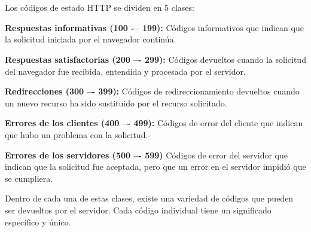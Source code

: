 \documentclass[10pt,a4paper]{article} %
\begin{document}

\pagebreak

\section{\color{colorIPN}{Desarrollo}}

\subsection{ }
{\large Los c{\'o}digos de estado HTTP se dividen en 5 clases:}

\begin{itemize}
	{\large
	    \item \textbf{Respuestas informativas (100 -– 199):} C{\'o}digos informativos que indican que la solicitud iniciada por el navegador contin{\'u}a.
	    \item \textbf{Respuestas satisfactorias (200 –- 299):} C{\'o}digos devueltos cuando la solicitud del navegador fue recibida, entendida y procesada por el servidor.
	    \item \textbf{Redirecciones (300 –- 399):} C{\'o}digos de redireccionamiento devueltos cuando un nuevo recurso ha sido sustituido por el recurso solicitado.
	    \item \textbf{Errores de los clientes (400 –- 499):} C{\'o}digos de error del cliente que indican que hubo un problema con la solicitud.-
	    \item \textbf{Errores de los servidores (500 –- 599)} C{\'o}digos de error del servidor que indican que la solicitud fue aceptada, pero que un error en el servidor impidi{\'o} que se cumpliera.}
\end{itemize}

{\large Dentro de cada una de estas clases, existe una variedad de c{\'o}digos que pueden ser devueltos por el servidor. Cada c{\'o}digo individual tiene un significado espec{\'i}fico y {\'u}nico.}

\subsection{}
\end{document}
